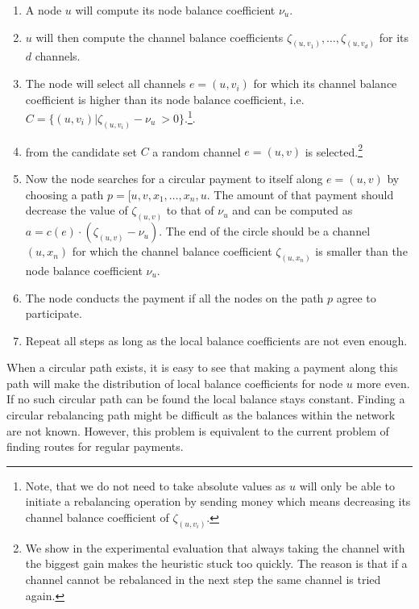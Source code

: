\documentclass[a4paper]{paper}
\begin{document}
\begin{enumerate}
\item A node $u$ will compute its node balance coefficient $\nu_u$.
\item $u$ will then compute the channel balance coefficients $\zeta_{(u,v_1)},\dots,\zeta_{(u,v_d)}$ for its $d$ channels.
\item The node will select all channels $e=(u,v_i)$ for which its channel balance coefficient is higher 
than its node balance coefficient, i.e.~$C = \{(u,v_i) | \zeta_{(u,v_i)} - \nu_u\ > 0\}$.\footnote{
  Note, that we do not need to take absolute values as $u$ will only be able to initiate a rebalancing operation by sending money which means decreasing its channel balance coefficient of $\zeta_{(u,v_i)}$.}.
\item from the candidate set $C$ a random channel $e=(u,v)$ is selected.\footnote{
  We show in the experimental evaluation that always taking the channel with the biggest gain makes the heuristic stuck too quickly. 
  The reason is that if a channel cannot be rebalanced in the next step the same channel is tried again.} 
\item Now the node searches for a circular payment to itself along $e=(u,v)$ by choosing a path $p = [u,v,x_1,\dots,x_n,u$. The amount of that payment should decrease the value of $\zeta_{(u,v)}$ to that of $\nu_u$ and can be computed as $a = c(e)\cdot (\zeta_{(u,v)}-\nu_u)$. The end of the circle should be a channel $(u,x_n)$ for which the channel balance coefficient $\zeta_{(u,x_n)}$ is smaller than the node balance coefficient $\nu_u$.
\item The node conducts the payment if all the nodes on the path $p$ agree to participate. 
\item Repeat all steps as long as the local balance coefficients are not even enough.
\end{enumerate}

When a circular path exists, it is easy to see that making a payment along this path will make the distribution of local balance coefficients for node $u$ more even.
If no such circular path can be found the local balance stays constant.
Finding a circular rebalancing path might be difficult as the balances within the network are not known. 
However, this problem is equivalent to the current problem of finding routes for regular payments.
\end{document}
